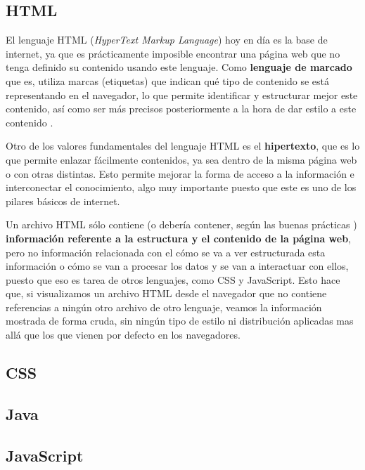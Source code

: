 
\subsection{HTML}

El lenguaje HTML (\textit{HyperText Markup Language}) hoy en día es la base de internet, ya que es prácticamente imposible encontrar una página web que no tenga definido su contenido usando este lenguaje. Como \textbf{lenguaje de marcado} que es, utiliza marcas (etiquetas) que indican qué tipo de contenido se está representando en el navegador, lo que permite identificar y estructurar mejor este contenido, así como ser más precisos posteriormente a la hora de dar estilo a este contenido \cite{mdn:html}.

Otro de los valores fundamentales del lenguaje HTML es el \textbf{hipertexto}, que es lo que permite enlazar fácilmente contenidos, ya sea dentro de la misma página web o con otras distintas. Esto permite mejorar la forma de acceso a la información e interconectar el conocimiento, algo muy importante puesto que este es uno de los pilares básicos de internet.

Un archivo HTML sólo contiene (o debería contener, según las buenas prácticas \cite{midudev:html}) \textbf{información referente a la estructura y el contenido de la página web}, pero no información relacionada con el cómo se va a ver estructurada esta información o cómo se van a procesar los datos y se van a interactuar con ellos, puesto que eso es tarea de otros lenguajes, como CSS y JavaScript. Esto hace que, si visualizamos un archivo HTML desde el navegador que no contiene referencias a ningún otro archivo de otro lenguaje, veamos la información mostrada de forma cruda, sin ningún tipo de estilo ni distribución aplicadas mas allá que los que vienen por defecto en los navegadores.

\subsection{CSS}


\subsection{Java}


\subsection{JavaScript}

